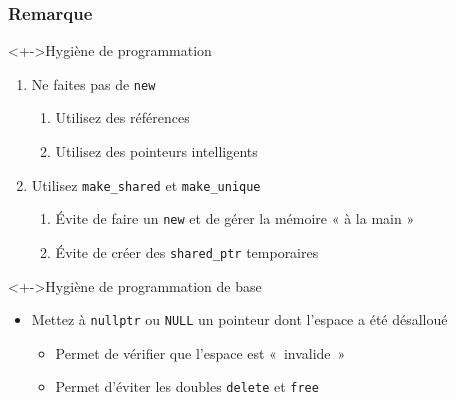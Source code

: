 \begin{frame}
\frametitle{Remarque}
\begin{block}<+->{Hygiène de programmation \cpp}
	\begin{enumerate}[<+->]
	 \item Ne faites pas de \lstinline|new|
		 \begin{enumerate}
		 \item Utilisez des références
		 \item Utilisez des pointeurs intelligents
		 \end{enumerate}
	\item Utilisez \texttt{make\_shared} et \texttt{make\_unique}
		\begin{enumerate}
		\item Évite de faire un \lstinline|new| et de gérer la mémoire « à la main »	
		\item Évite de créer des \texttt{shared\_ptr} temporaires			
		\end{enumerate}
	\end{enumerate}
\end{block}
\begin{block}<+->{Hygiène de programmation de base}
	\begin{itemize}[<+->]
	\item Mettez à \lstinline|nullptr| ou \lstinline|NULL| un pointeur dont l'espace a été désalloué
		\begin{itemize}
		\item Permet de vérifier que l'espace est «~invalide~»
		\item Permet d'éviter les doubles \lstinline|delete| et \lstinline|free|
		\end{itemize}
	\end{itemize}
\end{block}
\end{frame}


